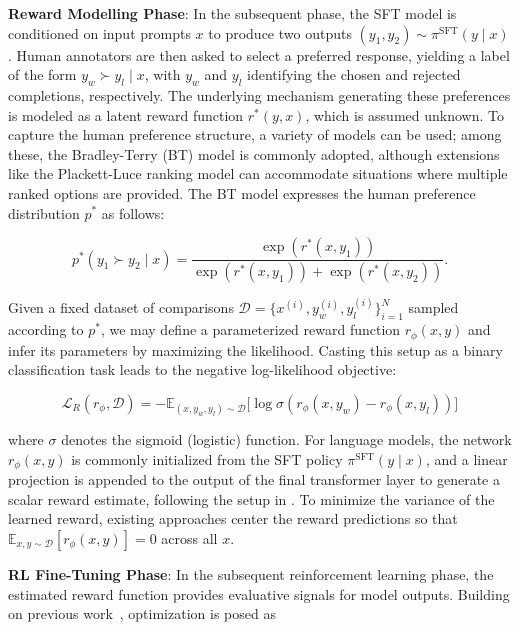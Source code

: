 \textbf{Reward Modelling Phase}: In the subsequent phase, the SFT model is conditioned on input prompts $x$ to produce two outputs $(y_1, y_2)\sim \pi^\text{SFT}(y \mid x)$. Human annotators are then asked to select a preferred response, yielding a label of the form $y_w\succ y_l \mid x$, with $y_w$ and $y_l$ identifying the chosen and rejected completions, respectively. The underlying mechanism generating these preferences is modeled as a latent reward function $r^*(y, x)$, which is assumed unknown. To capture the human preference structure, a variety of models can be used; among these, the Bradley-Terry (BT) model \cite{bradley1952rankanalysis} is commonly adopted, although extensions like the Plackett-Luce ranking model \citep{plackett1975analysis, luce2012individual} can accommodate situations where multiple ranked options are provided. The BT model expresses the human preference distribution $p^*$ as follows:

\begin{equation}\label{eq:bradley-terry}
    p^*(y_1\succ y_2 \mid x)=\frac{\exp\left(r^*(x, y_1)\right)}{\exp\left(r^*(x, y_1)\right) + \exp\left(r^*(x, y_2)\right)}.
\end{equation}

Given a fixed dataset of comparisons $\mathcal{D}=\bigl\{x^{(i)}, y_w^{(i)}, y_l^{(i)}\bigr\}_{i=1}^N$ sampled according to $p^*$, we may define a parameterized reward function $r_{\phi}(x, y)$ and infer its parameters by maximizing the likelihood. Casting this setup as a binary classification task leads to the negative log-likelihood objective:

\begin{equation}\label{eq:reward_model}
    \mathcal{L}_R(r_{\phi}, \mathcal{D}) = -\mathbb{E}_{(x, y_w, y_l)\sim \mathcal{D}}\bigl[\log \sigma(r_{\phi}(x, y_w)- r_{\phi}(x, y_l))\bigr]
\end{equation}

where $\sigma$ denotes the sigmoid (logistic) function. For language models, the network $r_{\phi}(x, y)$ is commonly initialized from the SFT policy $\pi^\text{SFT}(y \mid x)$, and a linear projection is appended to the output of the final transformer layer to generate a scalar reward estimate, following the setup in \cite{ziegler2020finetuning}. To minimize the variance of the learned reward, existing approaches center the reward predictions so that  $\mathbb{E}_{x,y\sim \mathcal{D}}\left[r_\phi(x, y)\right] = 0$ across all $x$.

\textbf{RL Fine-Tuning Phase}: In the subsequent reinforcement learning phase, the estimated reward function provides evaluative signals for model outputs. Building on previous work~\citep{jaques2017sequence, jaques2020human}, optimization is posed as

